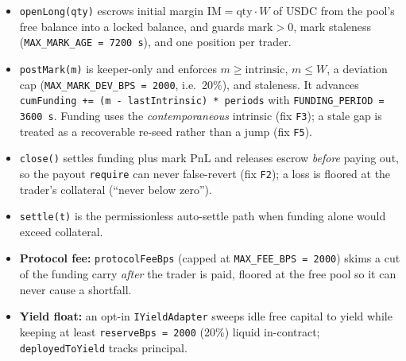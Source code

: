 \documentclass[11pt]{article}
\newcommand{\code}[1]{\texttt{\small #1}}
\begin{document}
\begin{itemize}[leftmargin=1.4em,itemsep=3pt]
  \item \code{openLong(qty)} escrows initial margin $\text{IM} = \text{qty}\cdot W$ of USDC from the
        pool's free balance into a locked balance, and guards $\text{mark}>0$, mark staleness
        (\code{MAX\_MARK\_AGE = 7200\,s}), and one position per trader.
  \item \code{postMark(m)} is keeper-only and enforces $m \geq \text{intrinsic}$, $m \leq W$, a
        deviation cap (\code{MAX\_MARK\_DEV\_BPS = 2000}, i.e.\ 20\%), and staleness. It advances
        \code{cumFunding += (m - lastIntrinsic) * periods} with \code{FUNDING\_PERIOD = 3600\,s}.
        Funding uses the \emph{contemporaneous} intrinsic (fix \code{F3}); a stale gap is treated as
        a recoverable re-seed rather than a jump (fix \code{F5}).
  \item \code{close()} settles funding plus mark PnL and releases escrow \emph{before} paying out, so
        the payout \code{require} can never false-revert (fix \code{F2}); a loss is floored at the
        trader's collateral (``never below zero'').
  \item \code{settle(t)} is the permissionless auto-settle path when funding alone would exceed
        collateral.
  \item \textbf{Protocol fee:} \code{protocolFeeBps} (capped at \code{MAX\_FEE\_BPS = 2000}) skims a
        cut of the funding carry \emph{after} the trader is paid, floored at the free pool so it can
        never cause a shortfall.
  \item \textbf{Yield float:} an opt-in \code{IYieldAdapter} sweeps idle free capital to yield while
        keeping at least \code{reserveBps = 2000} (20\%) liquid in-contract; \code{deployedToYield}
        tracks principal.
\end{itemize}
\end{document}
